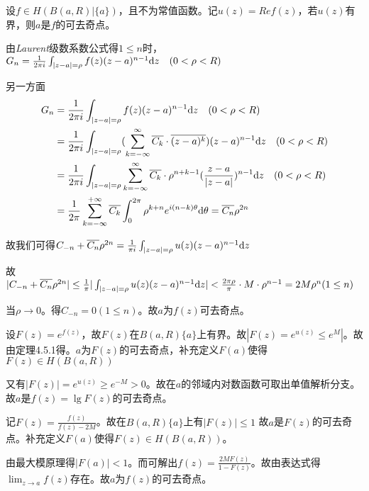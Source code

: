\begin{eg}
	\color{blue}设$f\in H(B(a,R )|\{ a\})$，且不为常值函数。记$u(z)=Ref(z)$，若$u(z)$有界，则$a$是$f$的可去奇点。
	\color{black}
	\begin{jie}{1}
		
		
		由\emph{Laurent}级数系数公式得$1\le n$时，$G_{n}=\frac{1}{2\pi i}\int_{|z-a|=\rho}f(z)(z-a)^{n-1}\mathrm{d}z \quad(0<\rho<R)$
		
		另一方面
		\begin{align*}
		G_{n}&=\frac{1}{2\pi i}\int_{|z-a|=\rho}f(z)(z-a)^{n-1}\mathrm{d}z \quad(0<\rho<R)\\
		&=\frac{1}{2\pi i}\int_{|z-a|=\rho}(\sum_{k=-\infty}^{\infty }\overline{C_{k}}\cdot\overline{(z-a)^{k}})(z-a)^{n-1}\mathrm{d}z \quad(0<\rho<R)\\
		&=\frac{1}{2\pi i}\int_{|z-a|=\rho}\sum_{k=-\infty}^{\infty }\overline{C_{k}} \cdot \rho^{n+k-1}(\frac{z-a}{|z-a|})^{n-1}\mathrm{d}z \quad(0<\rho<R)\\
		&=\frac{1}{2\pi}\sum_{k=-\infty}^{+\infty}\overline{C_{k}}\int_{0}^{2\pi}\rho^{k+n}e^{i(n-k)\theta}\mathrm{d}\theta=\overline{C_{n}}\rho^{2n}
		\end{align*}
		
		故我们可得$C_{-n}+\overline{C_{n}}\rho^{2n}=\frac{1}{\pi i}\int_{|z-a|=\rho}u(z)(z-a)^{n-1}\mathrm{d}z$
		
		故$|C_{-n}+\overline{C_{n}}\rho^{2n}|\le \frac{1}{\pi}|\int_{|z-a|=\rho}u(z)(z-a)^{n-1}\mathrm{d}z|<\frac{2\pi \rho}{\pi}\cdot M \cdot \rho^{n-1}=2M\rho^{n}(1\le n)$
		
		当$\rho\rightarrow 0$。得$C_{-n}=0(1\le n)$。故$a$为$f(z)$可去奇点。
	\end{jie}
	\begin{jie}{2}
		
		
		设$F(z)=e^{f(z)}$，故$F(z)$在$B(a,R)\{ a\}$上有界。故$|F(z)=e^{u(z)}\le e^{M}|$。故由定理4.5.1得。$a$为$F(z)$的可去奇点，补充定义$F(a)$使得$F(z)\in H(B(a,R))$
		
		又有$|F(z)|=e^{u(z)}\ge e^{-M}>0$。故在$a$的邻域内对数函数可取出单值解析分支。故$a$是$f(z)=\lg F(z)$的可去奇点。
	\end{jie}
	\begin{jie}{3}
		
		记$F(z)=\frac{f(z)}{f(z)-2M}$。故在$B(a,R)\{a\}$上有$|F(z)|\le 1$
		故$a$是$F(z)$的可去奇点。补充定义$F(a)$使得$F(z)\in H(B(a,R))$。
		
		由最大模原理得$|F(a)|<1$。而可解出$f(z)=\frac{2MF(z)}{1-F(z)}$。故由表达式得$\displaystyle\lim_{z\rightarrow a}f(z)$存在。故$a$为$f(z)$的可去奇点。
	\end{jie}
\end{eg}




